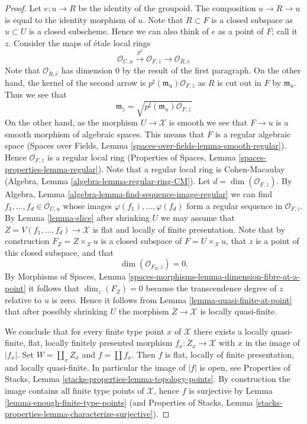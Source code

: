 \documentclass[10pt,a4paper]{amsart}
\theoremstyle{plain}
\theoremstyle{definition}
\theoremstyle{remark}
\numberwithin{equation}{subsection}
\begin{document}
\begin{proof}
\medskip\noindent
Let $e : u \to R$ be the identity of the groupoid. The composition
$u \to R \to u$ is equal to the identity morphism of $u$.
Note that $R \subset F$ is a closed
subspace as $u \subset U$ is a closed subscheme. Hence we can also think
of $e$ as a point of $F$; call it $z$.
Consider the maps of \'etale local rings
$$
\mathcal{O}_{U, u}
\xrightarrow{p^\sharp}
\mathcal{O}_{F, \overline{z}}
\longrightarrow
\mathcal{O}_{R, \overline{e}}
$$
Note that $\mathcal{O}_{R, \overline{e}}$ has dimension $0$ by the result
of the first paragraph. On the other hand, the kernel of the second arrow is
$p^\sharp(\mathfrak m_u)\mathcal{O}_{F, \overline{z}}$ as
$R$ is cut out in $F$ by $\mathfrak m_u$. Thus we see that
$$
\mathfrak m_{\overline{z}} =
\sqrt{p^\sharp(\mathfrak m_u)\mathcal{O}_{F, \overline{z}}}
$$
On the other hand, as the morphism $U \to \mathcal{X}$ is smooth
we see that $F \to u$ is a smooth morphism of algebraic spaces.
This means that $F$ is a regular algebraic space
(Spaces over Fields, Lemma \ref{spaces-over-fields-lemma-smooth-regular}).
Hence $\mathcal{O}_{F, \overline{z}}$ is a regular local ring
(Properties of Spaces, Lemma \ref{spaces-properties-lemma-regular}).
Note that a regular local ring is Cohen-Macaulay
(Algebra, Lemma \ref{algebra-lemma-regular-ring-CM}).
Let $d = \dim(\mathcal{O}_{F, \overline{z}})$. By
Algebra, Lemma \ref{algebra-lemma-find-sequence-image-regular}
we can find $f_1, \ldots, f_d \in \mathcal{O}_{U, u}$ whose images
$\varphi(f_1), \ldots, \varphi(f_d)$ form a regular sequence
in $\mathcal{O}_{F, \overline{z}}$. By
Lemma \ref{lemma-slice}
after shrinking $U$ we may assume that
$Z = V(f_1, \ldots, f_d) \to \mathcal{X}$ is flat and
locally of finite presentation. Note that by construction
$F_Z = Z \times_\mathcal{X} u$ is a closed subspace of
$F = U \times_\mathcal{X} u$, that $z$ is a point of this closed subspace,
and that
$$
\dim(\mathcal{O}_{F_Z, \overline{z}}) = 0.
$$
By
Morphisms of Spaces,
Lemma \ref{spaces-morphisms-lemma-dimension-fibre-at-a-point}
it follows that $\dim_z(F_Z) = 0$ because the transcendence degree
of $z$ relative to $u$ is zero. Hence it follows from
Lemma \ref{lemma-quasi-finite-at-point}
that after possibly shrinking $U$ the morphism $Z \to \mathcal{X}$
is locally quasi-finite.

\medskip\noindent
We conclude that for every finite type point $x$ of $\mathcal{X}$ there
exists a locally quasi-finite, flat, locally finitely presented
morphism $f_x : Z_x \to \mathcal{X}$ with $x$ in the image of $|f_x|$.
Set $W = \coprod_x Z_x$ and $f = \coprod f_x$. Then $f$ is flat, locally
of finite presentation, and locally quasi-finite. In particular the
image of $|f|$ is open, see
Properties of Stacks, Lemma \ref{stacks-properties-lemma-topology-points}.
By construction the image contains all finite type points of $\mathcal{X}$,
hence $f$ is surjective by
Lemma \ref{lemma-enough-finite-type-points} (and
Properties of Stacks, Lemma
\ref{stacks-properties-lemma-characterize-surjective}).
\end{proof}
\end{document}
